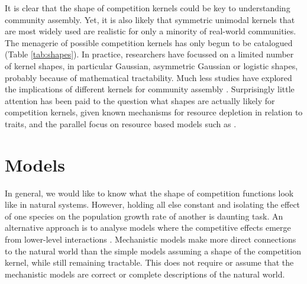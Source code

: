 \documentclass[a4paper,11pt]{article}
\begin{document}

It is clear that the shape of competition kernels
could be key to
understanding community assembly. Yet, it is also likely that
symmetric unimodal kernels that are most widely used are realistic for only
a minority of
real-world communities. The menagerie of possible
competition
kernels has only begun to be catalogued (Table \ref{tab:shapes}). In practice, researchers have focussed on a limited number of kernel
shapes, in particular Gaussian, asymmetric Gaussian or logistic
shapes, probably because of mathematical tractability. Much
less studies have explored the implications of different kernels for community
assembly
\citep{Barabas-2012,Barabas-2013,DAndrea-2013,Leimar-2013}.
Surprisingly little attention has been paid to the question what
shapes are actually likely for competition kernels, given known
mechanisms for resource depletion in relation to traits, and the
parallel focus on resource based models such as \Rstar.

\section{Models}

In general, we would like to know what the shape of competition
functions look like in natural systems.  However, holding all else
constant and isolating the effect of one species on the population
growth rate of another is daunting task.
An alternative approach is to analyse models where the competitive
effects emerge from lower-level interactions
\citep[e.g.,][]{Draghi-2012}.  Mechanistic models make more direct
connections to the natural world than the simple models assuming a
shape of the competition kernel,
while still remaining tractable.  This does not require or assume that
the mechanistic models are correct or complete descriptions of the
natural world.
\end{document}
